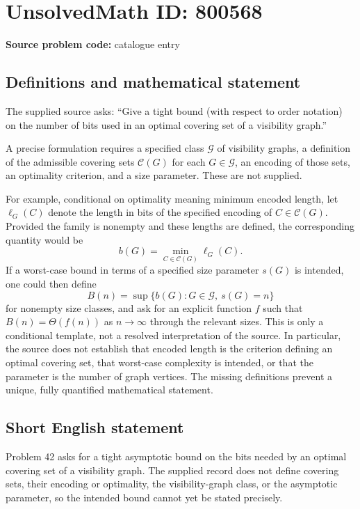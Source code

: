 \documentclass[11pt]{article}
\begin{document}
\section*{UnsolvedMath ID: 800568}
\textbf{Source problem code:} catalogue entry
\subsection{Definitions and mathematical statement}
The supplied source asks: ``Give a tight bound (with respect to order notation) on the number of bits used in an optimal covering set of a visibility graph.''

A precise formulation requires a specified class \(\mathcal G\) of visibility graphs, a definition of the admissible covering sets \(\mathcal C(G)\) for each \(G\in\mathcal G\), an encoding of those sets, an optimality criterion, and a size parameter. These are not supplied.

For example, conditional on optimality meaning minimum encoded length, let \(\ell_G(C)\) denote the length in bits of the specified encoding of \(C\in\mathcal C(G)\). Provided the family is nonempty and these lengths are defined, the corresponding quantity would be
\[
 b(G)=\min_{C\in\mathcal C(G)}\ell_G(C).
\]
If a worst-case bound in terms of a specified size parameter \(s(G)\) is intended, one could then define
\[
 B(n)=\sup\{b(G):G\in\mathcal G,\ s(G)=n\}
\]
for nonempty size classes, and ask for an explicit function \(f\) such that \(B(n)=\Theta(f(n))\) as \(n\to\infty\) through the relevant sizes. This is only a conditional template, not a resolved interpretation of the source. In particular, the source does not establish that encoded length is the criterion defining an optimal covering set, that worst-case complexity is intended, or that the parameter is the number of graph vertices. The missing definitions prevent a unique, fully quantified mathematical statement.
\subsection{Short English statement}
Problem 42 asks for a tight asymptotic bound on the bits needed by an optimal covering set of a visibility graph. The supplied record does not define covering sets, their encoding or optimality, the visibility-graph class, or the asymptotic parameter, so the intended bound cannot yet be stated precisely.
\end{document}

